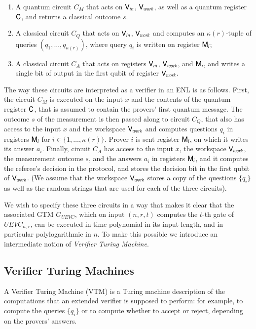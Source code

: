 \begin{enumerate}
\item A quantum circuit $C_M$ that acts on ${\mathsf{V}}_{in}$, ${\mathsf{V}}_{work}$, as well as a quantum register ${\mathsf{C}}$, and returns a classical outcome $s$. %
\item A classical circuit $C_Q$ that acts on ${\mathsf{V}}_{in}$, ${\mathsf{V}}_{work}$ %
and computes an $\kappa(r)$-tuple of queries $(q_1,\ldots,q_{\kappa(r)})$, where query $q_i$ is written on register ${\mathsf{M}}_i$;
\item A classical circuit $C_A$ that acts on registers ${\mathsf{V}}_{in}$, ${\mathsf{V}}_{work}$, %
and ${\mathsf{M}}_{i}$, and writes a single bit of output in the first qubit of register ${\mathsf{V}}_{work}$. %
\end{enumerate}
The way these circuits are interpreted as a verifier in an ENL is as follows. First, the circuit $C_M$ is executed on the input $x$ and the contents of the quantum register ${\mathsf{C}}$, that is assumed to contain the provers' first quantum message. The outcome $s$ of the measurement is then passed along to circuit $C_Q$, that also has access to the input $x$ and the workspace ${\mathsf{V}}_{work}$ and computes questions $q_i$ in registers ${\mathsf{M}}_{i}$ for $i\in\{1,\ldots,\kappa(r)\}$. Prover $i$ is sent register ${\mathsf{M}}_i$, on which it writes its answer $a_i$. Finally, circuit $C_A$ has access to the input $x$, the workspace ${\mathsf{V}}_{work}$, the measurement outcome $s$, and the answers $a_i$ in registers ${\mathsf{M}}_i$, and it computes the referee's decision in the protocol, and stores the decision bit in the first qubit of ${\mathsf{V}}_{work}$. (We assume that the workspace ${\mathsf{V}}_{work}$ stores a copy of the questions $\{q_i\}$ as well as the random strings that are used for each of the three circuits). 

We wish to specify these three circuits in a way that makes it clear that the associated GTM $G_{UEVC}$, which on input $(n,r,t)$ computes the $t$-th gate of $UEVC_{n,r}$, can be executed in time polynomial in its input length, and in particular polylogarithmic in $n$. To make this possible we introduce an intermediate notion of \emph{Verifier Turing Machine}. 

\subsection{ Verifier Turing Machines}
\label{sec:vtm}

A Verifier Turing Machine (VTM) is a Turing machine description of the computations that an extended verifier is supposed to perform: for example, to compute the queries $\{q_i\}$ or to compute whether to accept or reject, depending on the provers' answers.


